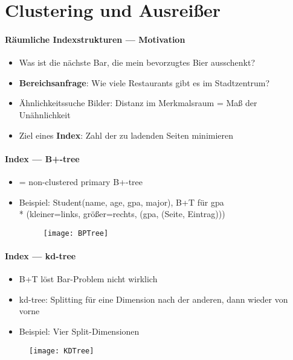 \section{Clustering und Ausreißer}
\label{sec:clustering}

\paragraph{Räumliche Indexstrukturen --- Motivation}
\begin{itemize}
	\item Was ist die nächste Bar, die mein bevorzugtes Bier ausschenkt?
	\item \textbf{Bereichsanfrage}: Wie viele Restaurants gibt es im Stadtzentrum?
	\item Ähnlichkeitssuche Bilder: Distanz im Merkmalsraum = Maß der Unähnlichkeit
	\item Ziel eines \textbf{Index}: Zahl der zu ladenden Seiten minimieren
\end{itemize}

\paragraph{Index --- B+-tree}
\begin{itemize}
	\item = non-clustered primary B+-tree
	\item Beispiel: Student(name, age, gpa, major), B+T für gpa \\* (kleiner=links, größer=rechts, (gpa, (Seite, Eintrag)))
	\begin{figure}[H]\centering\label{BPTree}\texttt{[image: BPTree]}\end{figure}
\end{itemize}



\paragraph{Index --- kd-tree}
\begin{itemize}
	\item B+T löst Bar-Problem nicht wirklich
	\item kd-tree: Splitting für eine Dimension nach der anderen, dann wieder von vorne
	\item Beispiel: Vier Split-Dimensionen
\end{itemize}
\begin{figure}[H]\centering\label{KDTree}\texttt{[image: KDTree]}\end{figure}


